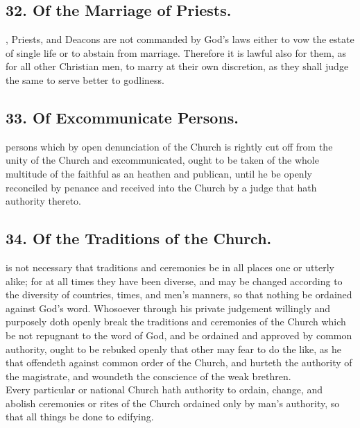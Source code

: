 \subsection{32. Of the Marriage of Priests.}
, Priests, and Deacons are not commanded by God's laws either to vow the estate of single life or to abstain from marriage. Therefore it is lawful also for them, as for all other Christian men, to marry at their own discretion, as they shall judge the same to serve better to godliness.

\subsection{33. Of Excommunicate Persons.}
 persons which by open denunciation of the Church is rightly cut off from the unity of the Church and excommunicated, ought to be taken of the whole multitude of the faithful as an heathen and publican, until he be openly reconciled by penance and received into the Church by a judge that hath authority thereto.

\subsection{34. Of the Traditions of the Church.}
 is not necessary that traditions and ceremonies be in all places one or utterly alike; for at all times they have been diverse, and may be changed according to the diversity of countries, times, and men's manners, so that nothing be ordained against God's word. Whosoever through his private judgement willingly and purposely doth openly break the traditions and ceremonies of the Church which be not repugnant to the word of God, and be ordained and approved by common authority, ought to be rebuked openly that other may fear to do the like, as he that offendeth against common order of the Church, and hurteth the authority of the magistrate, and woundeth the conscience of the weak brethren.\\
Every particular or national Church hath authority to ordain, change, and abolish ceremonies or rites of the Church ordained only by man's authority, so that all things be done to edifying.

